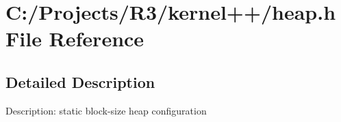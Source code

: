 \section{C:/Projects/R3/kernel++/heap.h File Reference}
\label{heap_8h}


\subsection{Detailed Description}
Description: static block-\/size heap configuration 